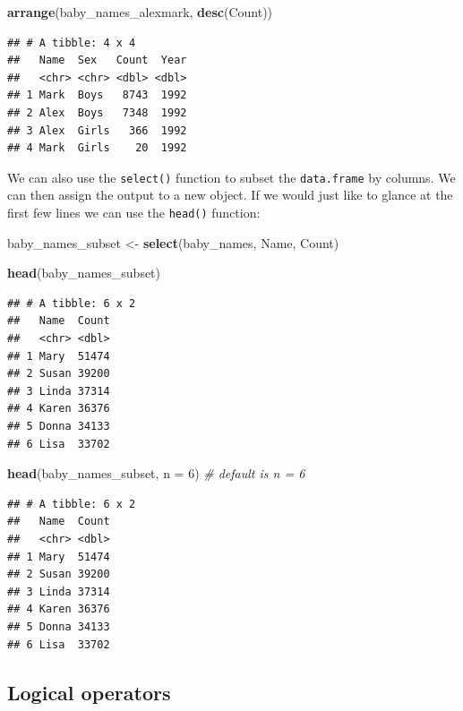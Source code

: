 \documentclass[]{book}
\newenvironment{Shaded}{\begin{snugshade}}{\end{snugshade}}
\newcommand{\KeywordTok}[1]{\textcolor[rgb]{0.13,0.29,0.53}{\textbf{#1}}}
\newcommand{\DataTypeTok}[1]{\textcolor[rgb]{0.13,0.29,0.53}{#1}}
\newcommand{\DecValTok}[1]{\textcolor[rgb]{0.00,0.00,0.81}{#1}}
\newcommand{\StringTok}[1]{\textcolor[rgb]{0.31,0.60,0.02}{#1}}
\newcommand{\CommentTok}[1]{\textcolor[rgb]{0.56,0.35,0.01}{\textit{#1}}}
\newcommand{\NormalTok}[1]{#1}
\begin{document}
\begin{Shaded}
\begin{Highlighting}[]
\KeywordTok{arrange}\NormalTok{(baby_names_alexmark, }\KeywordTok{desc}\NormalTok{(Count))}
\end{Highlighting}
\end{Shaded}

\begin{verbatim}
## # A tibble: 4 x 4
##   Name  Sex   Count  Year
##   <chr> <chr> <dbl> <dbl>
## 1 Mark  Boys   8743  1992
## 2 Alex  Boys   7348  1992
## 3 Alex  Girls   366  1992
## 4 Mark  Girls    20  1992
\end{verbatim}

We can also use the \texttt{select()} function to subset the
\texttt{data.frame} by columns. We can then assign the output to a new
object. If we would just like to glance at the first few lines we can
use the \texttt{head()} function:

\begin{Shaded}
\begin{Highlighting}[]
\NormalTok{baby_names_subset <-}\StringTok{ }\KeywordTok{select}\NormalTok{(baby_names, Name, Count)}

\KeywordTok{head}\NormalTok{(baby_names_subset)}
\end{Highlighting}
\end{Shaded}

\begin{verbatim}
## # A tibble: 6 x 2
##   Name  Count
##   <chr> <dbl>
## 1 Mary  51474
## 2 Susan 39200
## 3 Linda 37314
## 4 Karen 36376
## 5 Donna 34133
## 6 Lisa  33702
\end{verbatim}

\begin{Shaded}
\begin{Highlighting}[]
\KeywordTok{head}\NormalTok{(baby_names_subset, }\DataTypeTok{n =} \DecValTok{6}\NormalTok{) }\CommentTok{# default is n = 6}
\end{Highlighting}
\end{Shaded}

\begin{verbatim}
## # A tibble: 6 x 2
##   Name  Count
##   <chr> <dbl>
## 1 Mary  51474
## 2 Susan 39200
## 3 Linda 37314
## 4 Karen 36376
## 5 Donna 34133
## 6 Lisa  33702
\end{verbatim}

\subsection{Logical operators}\label{logical-operators}
\end{document}

